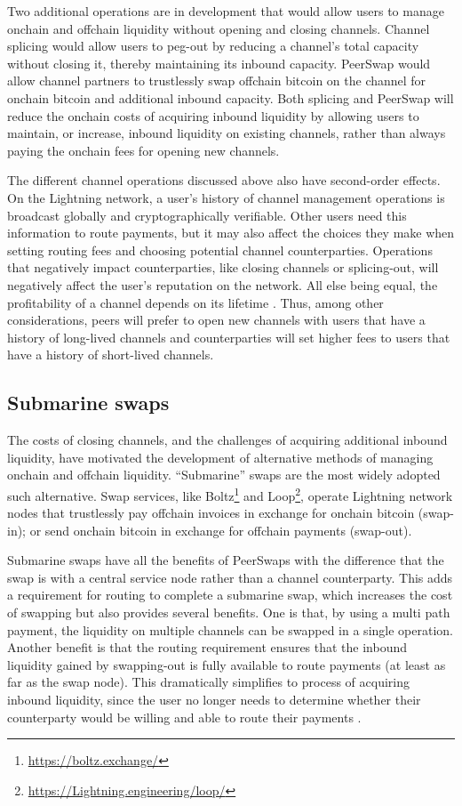 \documentclass[10pt,twocolumn]{article}
\begin{document}
Two additional operations are in development that would allow users to
manage onchain and offchain liquidity without opening and closing channels.
Channel splicing \citep{russel2018} would allow
users to peg-out by reducing a channel's total capacity
without closing it, thereby maintaining its inbound capacity.
PeerSwap \citep{togami2021} would allow channel partners to trustlessly
swap offchain bitcoin on the channel for onchain bitcoin
and additional inbound capacity.
Both splicing and PeerSwap will reduce the onchain costs of
acquiring inbound liquidity
by allowing users to maintain, or increase, inbound liquidity on existing channels,
rather than always paying the onchain fees for opening new channels.

The different channel operations discussed above
also have second-order effects.
On the Lightning network,
a user's history of channel management operations
is broadcast globally and cryptographically verifiable.
Other users need this information to route payments,
but it may also affect the choices they make
when setting routing fees and choosing potential channel counterparties.
Operations that negatively impact counterparties,
like closing channels or splicing-out,
will negatively affect the user's reputation on the network.
All else being equal,
the profitability of a channel depends on its lifetime \citep{branzei2018}.
Thus, among other considerations,
peers will prefer to open new channels
with users that have a history of long-lived channels
and counterparties will set higher fees to users
that have a history of short-lived channels.

\subsection{Submarine swaps}

The costs of closing channels,
and the challenges of acquiring additional inbound liquidity,
have motivated the development of alternative methods of
managing onchain and offchain liquidity.
``Submarine'' swaps \citep{bosworth2018} are the most widely adopted such alternative.
Swap services,
like Boltz\footnote{\url{https://boltz.exchange/}}
and Loop\footnote{\url{https://Lightning.engineering/loop/}},
operate Lightning network nodes that trustlessly
pay offchain invoices in exchange for onchain bitcoin (swap-in); or
send onchain bitcoin in exchange for offchain payments (swap-out).

Submarine swaps have all the benefits of PeerSwaps with the difference
that the swap is with a central service node rather than a channel counterparty.
This adds a requirement for routing to complete a submarine swap,
which increases the cost of swapping but also provides several benefits.
One is that, by using a multi path payment,
the liquidity on multiple channels can be swapped in a single operation.
Another benefit is that
the routing requirement ensures that the inbound
liquidity gained by swapping-out is fully available to route payments
(at least as far as the swap node).
This dramatically simplifies to process of acquiring inbound liquidity,
since the user no longer needs to determine whether
their counterparty would be willing and able to route their payments
\citep{ZmnSCPxj2020}.
\end{document}
